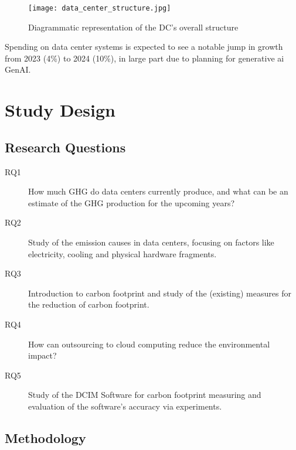 \documentclass[
  a4paper,  %
  twoside,  %
  bibliography=totoc,
  headsepline,
  cleardoublepage=empty,
  parskip=half,
  draft=false
]{scrbook}
\begin{document}
\begin{figure}
	\centering
	\texttt{[image: data\_center\_structure.jpg]}
	\caption{Diagrammatic representation of the DC's overall structure\cite{ZHU2023104322}}
	\label{dc_structure}
\end{figure}

Spending on data center systems is expected to see a notable jump in growth from 2023 (4\%) to 2024 (10\%), in large part due to planning for generative \gls{ai} GenAI\cite{Gartner2024}.


\chapter{Study Design}
\section{Research Questions}

\begin{description}
	\item[RQ1] How much GHG do data centers currently produce, and what can be an estimate of the GHG production for the upcoming years?
	\item[RQ2] Study of the emission causes in data centers, focusing on factors like electricity, cooling and physical hardware fragments.
	\item[RQ3] Introduction to carbon footprint and study of the (existing) measures for the reduction of carbon footprint. 
	\item[RQ4] How can outsourcing to cloud computing reduce the environmental impact?
	\item[RQ5] Study of the DCIM Software for carbon footprint measuring and evaluation of the software's accuracy via experiments.
\end{description}

\section{Methodology}

\end{document}
